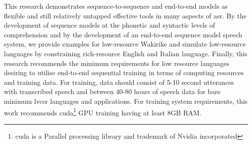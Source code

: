 This research demonstrates sequence-to-sequence and end-to-end models as flexible and still relatively untapped effective tools in many aspects of \acrshort{asr}.  By the development of sequence models at the phonetic and syntactic levels of comprehension and by the development of an end-to-end sequence model speech system, we provide examples for low-resource Wakirike and simulate low-resource languages by constraining rich-resource English and Italian language.   Finally, this research recommends the minimum requirements for low resource languages desiring to utilise end-to-end sequential training in terms of computing resources and training data.  For training, data should consist of 5-10 second utterances with transcribed speech and between 40-80 hours of speech data for bare minimum \acrshort{lvcsr} languages and applications.  For training system requirements, this work recommends \acrshort{cuda}\footnote{\acrfull{cuda} is a Parallel processing library and trademark of Nvidia incorporated} GPU training having at least 8GB RAM.
 




